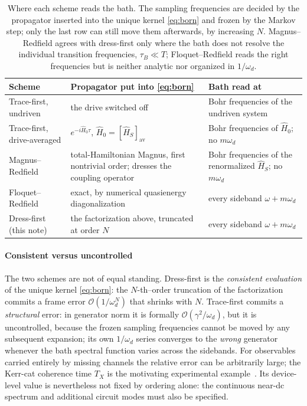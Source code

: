 \documentclass[a4paper,11pt]{article}
\newcommand{\av}[1]{\left[#1\right]_{\mathrm{av}}}
\begin{document}
\begin{table}[H]
  \centering\small
  \renewcommand{\arraystretch}{1.35}
  \begin{tabular}{@{}L{3.9cm}L{4.3cm}L{5.6cm}@{}}
    \toprule
    Scheme & Propagator put into \eqref{eq:born} & Bath read at \\
    \midrule
    Trace-first, undriven
    & the drive switched off
    & Bohr frequencies of the undriven system \\
    Trace-first, drive-averaged
    & $e^{-i\hat H_0\tau}$, $\hat H_0 = \av{\hat H_S}$
    & Bohr frequencies of $\hat H_0$; no $m\omega_d$ \\
    Magnus--Redfield~\cite{Mickiewicz2026}
    & total-Hamiltonian Magnus, first nontrivial order; dresses the coupling operator
    & Bohr frequencies of the renormalized $\hat H_S$; no $m\omega_d$ \\
    Floquet--Redfield~\cite{Grifoni1998Driven,hone2009Statisticala}
    & exact, by numerical quasienergy diagonalization
    & every sideband $\omega + m\omega_d$ \\
    Dress-first (this note)
    & the factorization above, truncated at order $N$
    & every sideband $\omega + m\omega_d$ \\
    \bottomrule
  \end{tabular}
  \caption{Where each scheme reads the bath. The sampling frequencies are decided by the propagator inserted into the unique kernel \eqref{eq:born} and frozen by the Markov step; only the last row can still move them afterwards, by increasing $N$. Magnus--Redfield agrees with dress-first only where the bath does not resolve the individual transition frequencies, $\tau_B\ll T$; Floquet--Redfield reads the right frequencies but is neither analytic nor organized in $1/\omega_d$.}
  \label{tab:sampling}
\end{table}

\paragraph{Consistent versus uncontrolled}
The two schemes are not of equal standing. Dress-first is the \emph{consistent evaluation} of the unique kernel \eqref{eq:born}: the $N$-th--order truncation of the factorization commits a frame error $\mathcal O(1/\omega_d^{N})$ that shrinks with $N$. Trace-first commits a \emph{structural} error: in generator norm it is formally $\mathcal O(\gamma^2/\omega_d)$, but it is uncontrolled, because the frozen sampling frequencies cannot be moved by any subsequent expansion; its own $1/\omega_d$ series converges to the \emph{wrong} generator whenever the bath spectral function varies across the sidebands. For observables carried entirely by missing channels the relative error can be arbitrarily large; the Kerr-cat coherence time $T_X$ is the motivating experimental example~\cite{Venkatraman2024Nonlinear}. Its device-level value is nevertheless not fixed by ordering alone: the continuous near-dc spectrum and additional circuit modes must also be specified.
\end{document}
